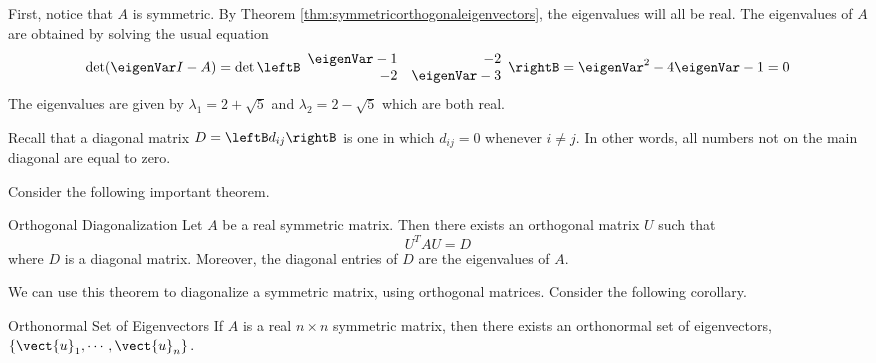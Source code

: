 \begin{solution}
First, notice that $A$ is symmetric. By Theorem \ref{thm:symmetricorthogonaleigenvectors}, the eigenvalues will all be real. The eigenvalues of $A$ are obtained by solving the usual equation 
\[
\det (\eigenVar I - A) = 
\det \leftB
\begin{array}{rr}
\eigenVar - 1 & -2 \\ 
-2 & \eigenVar - 3 
\end{array}
\rightB = \eigenVar^2 -4\eigenVar -1=0
\]
The eigenvalues are given by $\lambda_1 =2+
\sqrt{5}$ and $\lambda_2 =2-\sqrt{5}$ which are both real. 
\end{solution}

Recall that a diagonal matrix $D=\leftB d_{ij} \rightB$ is one in which $d_{ij} = 0$ whenever $i \neq j$. In other words, all numbers not on the main diagonal are equal to zero. 

Consider the following important theorem.

\begin{theorem}{Orthogonal Diagonalization}\label{thm:orthdiag}
Let $A$ be a real symmetric matrix. Then there exists an
orthogonal matrix $U$ such that 
\[
U^{T}AU = D
\]
where $D$ is a diagonal matrix. Moreover,
the diagonal entries of $D$ are the eigenvalues of $A$.
\end{theorem}

We can use this theorem to diagonalize a symmetric matrix, using orthogonal matrices. Consider the following corollary.

\begin{corollary}{Orthonormal Set of Eigenvectors}\label{cor:orthonormaleigenvectors}
If $A$ is a real $n\times n$ symmetric matrix, then there exists an
orthonormal set of eigenvectors, $\left\{ \vect{u}_{1},\cdots ,\vect{u}
_{n}\right\} .$
\end{corollary}


